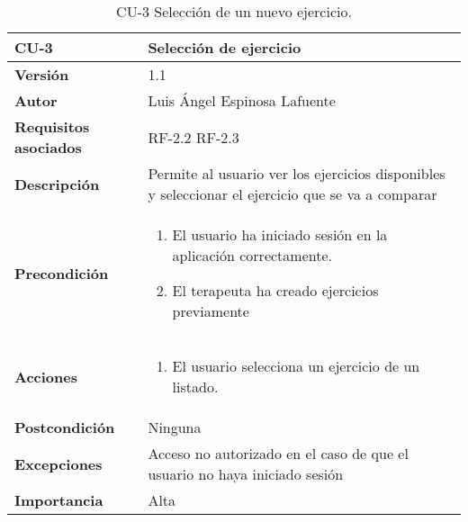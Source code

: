 \begin{table}[p]
	\centering
	\begin{tabularx}{\linewidth}{ p{} p{} }
		\toprule
		\textbf{CU-3}    & \textbf{Selección de ejercicio}\\
		\toprule
		\textbf{Versión}              & 1.1    \\
		\textbf{Autor}                &  Luis Ángel Espinosa Lafuente \\
		\textbf{Requisitos asociados} & RF-2.2 RF-2.3 \\
		\textbf{Descripción}          & Permite al usuario ver los ejercicios disponibles y seleccionar el ejercicio que se va a comparar\\
		\textbf{Precondición}         & 
		\begin{enumerate}		
			\def\labelenumi{\arabic{enumi}.}
			\tightlist
			\item El usuario ha iniciado sesión en la aplicación correctamente.
			\item El terapeuta ha creado ejercicios previamente 
		\end{enumerate}\\
		\textbf{Acciones}             &
		\begin{enumerate}
			\def\labelenumi{\arabic{enumi}.}
			\tightlist
			\item El usuario selecciona un ejercicio de un listado.
		\end{enumerate}\\
		\textbf{Postcondición}        & Ninguna \\
		\textbf{Excepciones}          & Acceso no autorizado en el caso de que el usuario no haya iniciado sesión \\
		\textbf{Importancia}          & Alta \\
		\bottomrule
	\end{tabularx}
	\caption{CU-3 Selección de un nuevo ejercicio.}
\end{table}

